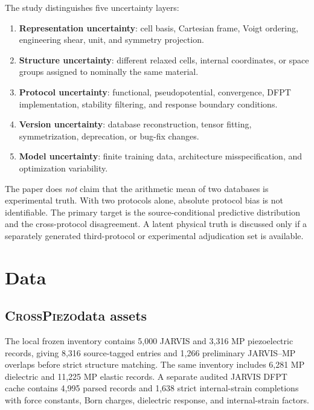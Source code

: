 \documentclass[11pt]{article}
\newcommand{\CrossPiezo}{\textsc{CrossPiezo}}
\begin{document}
The study distinguishes five uncertainty layers:
\begin{enumerate}[leftmargin=1.5em]
    \item \textbf{Representation uncertainty}: cell basis, Cartesian frame, Voigt ordering, engineering shear, unit, and symmetry projection.
    \item \textbf{Structure uncertainty}: different relaxed cells, internal coordinates, or space groups assigned to nominally the same material.
    \item \textbf{Protocol uncertainty}: functional, pseudopotential, convergence, DFPT implementation, stability filtering, and response boundary conditions.
    \item \textbf{Version uncertainty}: database reconstruction, tensor fitting, symmetrization, deprecation, or bug-fix changes.
    \item \textbf{Model uncertainty}: finite training data, architecture misspecification, and optimization variability.
\end{enumerate}

The paper does \emph{not} claim that the arithmetic mean of two databases is experimental truth. With two protocols alone, absolute protocol bias is not identifiable. The primary target is the source-conditional predictive distribution and the cross-protocol disagreement. A latent physical truth is discussed only if a separately generated third-protocol or experimental adjudication set is available.

\section{Data}

\subsection{\CrossPiezo data assets}

The local frozen inventory contains 5,000 JARVIS and 3,316 MP piezoelectric records, giving 8,316 source-tagged entries and 1,266 preliminary JARVIS--MP overlaps before strict structure matching. The same inventory includes 6,281 MP dielectric and 11,225 MP elastic records. A separate audited JARVIS DFPT cache contains 4,995 parsed records and 1,638 strict internal-strain completions with force constants, Born charges, dielectric response, and internal-strain factors.
\end{document}

